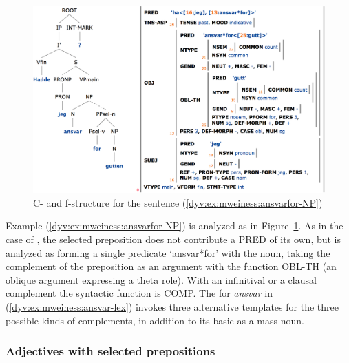 \documentclass[output=paper]{langsci/langscibook}
\begin{document}
\begin{figure}
  \includegraphics[width=\textwidth]{figures/ansvarfor-NP-c-f.png}
  \caption{C- and f-structure for the sentence (\ref{dyv:ex:mweiness:ansvarfor-NP}) }
  \label{dyv:fig:mweiness:ansvarfor-NP-c-f}
\end{figure}

Example (\ref{dyv:ex:mweiness:ansvarfor-NP}) is analyzed as in Figure~\ref{dyv:fig:mweiness:ansvarfor-NP-c-f}.
As in the case of , the selected preposition does not contribute a PRED of its own, but is analyzed as forming a single predicate `ansvar*for' with the noun, taking the complement of the preposition as an argument with the function OBL-TH (an oblique argument expressing a theta role).
With an infinitival or a clausal complement the syntactic function is COMP.
The  for \textit{ansvar} in (\ref{dyv:ex:mweiness:ansvar-lex}) invokes three alternative templates for the three possible kinds of complements, in addition to its basic  as a mass noun.


\subsubsection{Adjectives with selected prepositions}\label{dyv:sec:mweiness:prepadj}
\end{document}
